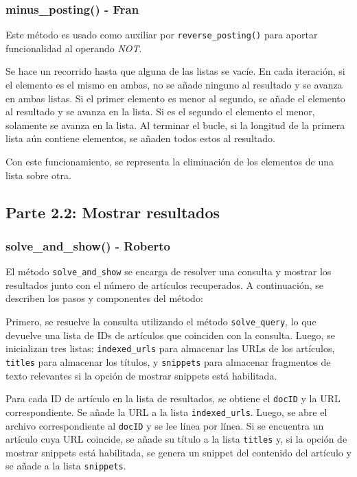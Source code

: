 \documentclass[12pt,a4paper]{article}
\begin{document}
\subsubsection{minus\_posting() - Fran}
Este método es usado como auxiliar por \texttt{reverse\_posting()} para aportar funcionalidad al operando \textit{NOT}.

Se hace un recorrido hasta que alguna de las listas se vacíe. En cada iteración, si el elemento es el mismo en ambas, no se añade ninguno al resultado y se avanza en ambas listas. Si el primer elemento es menor al segundo, se añade el elemento al resultado y se avanza en la lista. Si es el segundo el elemento el menor, solamente se avanza en la lista. Al terminar el bucle, si la longitud de la primera lista aún contiene elementos, se añaden todos estos al resultado.

Con este funcionamiento, se representa la eliminación de los elementos de una lista sobre otra.

\subsection{Parte 2.2: Mostrar resultados}
\subsubsection{solve\_and\_show() - Roberto}
El método \texttt{solve\_and\_show} se encarga de resolver una consulta y mostrar los resultados junto con el número de artículos recuperados. A continuación, se describen los pasos y componentes del método:

Primero, se resuelve la consulta utilizando el método \texttt{solve\_query}, lo que devuelve una lista de IDs de artículos que coinciden con la consulta. Luego, se inicializan tres listas: \texttt{indexed\_urls} para almacenar las URLs de los artículos, \texttt{titles} para almacenar los títulos, y \texttt{snippets} para almacenar fragmentos de texto relevantes si la opción de mostrar snippets está habilitada.

Para cada ID de artículo en la lista de resultados, se obtiene el \texttt{docID} y la URL correspondiente. Se añade la URL a la lista \texttt{indexed\_urls}. Luego, se abre el archivo correspondiente al \texttt{docID} y se lee línea por línea. Si se encuentra un artículo cuya URL coincide, se añade su título a la lista \texttt{titles} y, si la opción de mostrar snippets está habilitada, se genera un snippet del contenido del artículo y se añade a la lista \texttt{snippets}.
\end{document}
